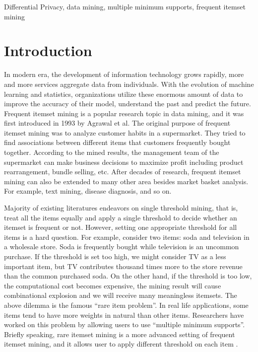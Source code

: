 \documentclass[conference]{IEEEtran}
\begin{document}
\begin{IEEEkeywords}
Differential Privacy, data mining, multiple minimum supports, frequent itemset mining
\end{IEEEkeywords}

\section{Introduction}
In modern era, the development of information technology grows rapidly, more and more services aggregate data from individuals. 
With the evolution of machine learning and statistics, organizations utilize these enormous amount of data to improve the accuracy of their model, understand the past and predict the future.
Frequent itemset mining is a popular research topic in data mining, and it was first introduced in 1993 by Agrawal et al.\cite{b1} 
The original purpose of frequent itemset mining was to analyze customer habits in a supermarket. 
They tried to find associations between different items that customers frequently bought together. 
According to the mined results, the management team of the supermarket can make business decisions to maximize profit including product rearrangement, bundle selling, etc.
After decades of research, frequent itemset mining can also be extended to many other area besides market basket analysis. For example, text mining, disease diagnosis, and so on.

Majority of existing literatures endeavors on single threshold mining, that is, treat all the items equally and apply a single threshold to decide whether an itemset is frequent or not.
However, setting one appropriate threshold for all items is a hard question. 
For example, consider two items: soda and television in a wholesale store. Soda is frequently bought while television is an uncommon purchase. 
If the threshold is set too high, we might consider TV as a less important item, but TV contributes thousand times more to the store revenue than the common purchased soda. 
On the other hand, if the threshold is too low, the computational cost becomes expensive, the mining result will cause combinational explosion and we will receive many meaningless itemsets. 
The above dilemma is the famous ``rare item problem''. In real life applications, some items tend to have more weights in natural than other items. 
Researchers \cite{b2}\cite{b3}\cite{b4}\cite{b5} have worked on this problem by allowing users to use ``multiple minimum supports''. 
Briefly speaking, rare itemset mining is a more advanced setting of frequent itemset mining, and it allows user to apply different threshold on each item .
\end{document}
